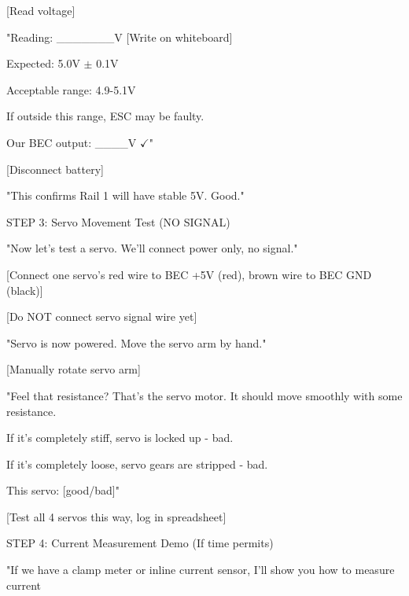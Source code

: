 \documentclass[11pt,letterpaper]{article}
\begin{document}
{[Read voltage]\par

"Reading: \_\_\_\_\_\_\_V [Write on whiteboard]\par

Expected: 5.0V $\pm$ 0.1V\par

Acceptable range: 4.9-5.1V\par

If outside this range, ESC may be faulty.\par

Our BEC output: \_\_\_\_V $\checkmark$"\par

[Disconnect battery]\par

"This confirms Rail 1 will have stable 5V. Good."\par

STEP 3: Servo Movement Test (NO SIGNAL)\par

"Now let's test a servo. We'll connect power only, no signal."\par

[Connect one servo's red wire to BEC +5V (red), brown wire to BEC GND (black)]\par

[Do NOT connect servo signal wire yet]\par

"Servo is now powered. Move the servo arm by hand."\par

[Manually rotate servo arm]\par

"Feel that resistance? That's the servo motor. It should move smoothly with some resistance.\par

If it's completely stiff, servo is locked up - bad.\par

If it's completely loose, servo gears are stripped - bad.\par

This servo: [good/bad]"\par

[Test all 4 servos this way, log in spreadsheet]\par

STEP 4: Current Measurement Demo (If time permits)\par

"If we have a clamp meter or inline current sensor, I'll show you how to measure current\par

}
\end{document}
